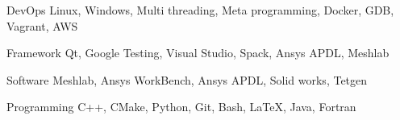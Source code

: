 

\begin{cvskills}

  \cvskill
    {DevOps} %
    {Linux, Windows, Multi threading, Meta programming, Docker, GDB, Vagrant, AWS} %

  \cvskill
    {Framework} %
    {Qt, Google Testing, Visual Studio, Spack, Ansys APDL, Meshlab} %

  \cvskill
    {Software} %
    {Meshlab, Ansys WorkBench, Ansys APDL, Solid works, Tetgen} %

  \cvskill
    {Programming} %
    {C++, CMake, Python, Git, Bash, LaTeX, Java, Fortran} %

\end{cvskills}
